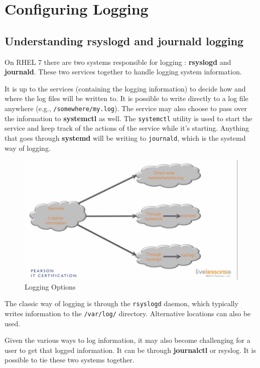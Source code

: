 \chapter{Configuring Logging}

\section{Understanding rsyslogd and journald logging}
On RHEL 7 there are two systems responsible for logging : \textbf{rsyslogd} and \textbf{journald}. These two services together to handle logging system information. 

It is up to the services (containing the logging information) to decide how and where the log files will be written to. It is possible to write directly to a log file anywhere (e.g., \verb|/somewhere/my.log|). The service may also choose to pass over the information to \textbf{systemctl} as well. The \verb|systemctl| utility is used to start the service and keep track of the actions of the service while it's starting. Anything that goes through \textbf{systemd} will be writing to \verb|journald|, which is the systemd way of logging. 

\begin{figure}[H]
	\centering
	\includegraphics[width=0.9\linewidth]{RHCSA/Mod2/chapters/2.14.a}
	\caption{Logging Options}
	\label{fig:2 Logging Options}
\end{figure}


\noindent
The classic way of logging is through the \verb|rsyslogd| daemon, which typically writes information to the \verb|/var/log/| directory. Alternative locations can also be used. 

Given the various ways to log information, it may also become challenging for a user to get that logged information. It can be through \textbf{journalctl} or rsyslog. It is possible to tie these two systems together.

